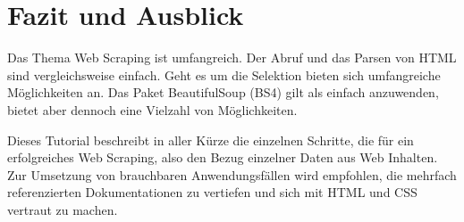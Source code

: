 
\chapter{Fazit und Ausblick}
\label{chapter-fazit}

Das Thema Web Scraping ist umfangreich. 
Der Abruf und das Parsen von HTML sind vergleichsweise einfach. 
Geht es um die Selektion bieten sich umfangreiche Möglichkeiten an.
Das Paket BeautifulSoup (BS4) gilt als einfach anzuwenden, bietet aber dennoch eine Vielzahl von Möglichkeiten.

Dieses Tutorial beschreibt in aller Kürze die einzelnen Schritte, die für ein erfolgreiches Web Scraping,
also den Bezug einzelner Daten aus Web Inhalten. Zur Umsetzung von brauchbaren Anwendungsfällen wird empfohlen,
die mehrfach referenzierten Dokumentationen zu vertiefen und sich mit HTML und CSS vertraut zu machen.